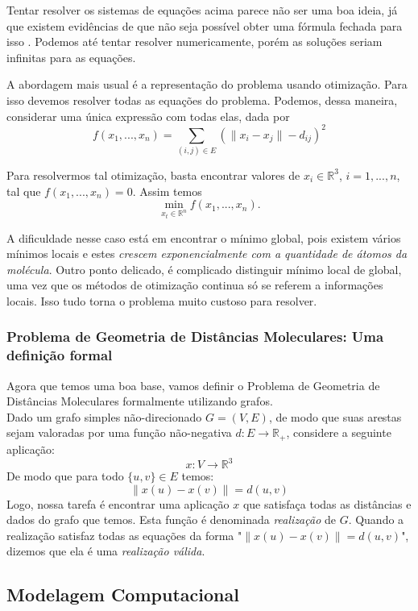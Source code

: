 \documentclass[a4paper,12pt]{article}
\begin{document}
\begin{itemize}
		Tentar resolver os sistemas de equações acima parece não ser uma boa ideia, já que existem evidências de que não seja possível obter uma fórmula fechada para isso \cite{carlileBook31Coloquio}. Podemos até tentar resolver numericamente, porém as soluções seriam infinitas para as equações.
		
		A abordagem mais usual é a representação do problema usando otimização. Para isso devemos  resolver todas as equações do problema. Podemos, dessa maneira, considerar uma única expressão com todas elas, dada por
		$$ f(x_1, ...,x_n) \equal \sum_{(i,j) \in E} (\|x_i - x_j\| - d_{ij})^2
		$$
		
		Para resolvermos tal otimização, basta encontrar valores de $x_i \in \mathbb{R}^3$, $i = 1, ..., n$, tal que $f(x_1, ...,x_n)=0.$ Assim temos
		$$ \min_{x_t \in\mathbb{R}^n} f(x_1, ...,x_n).
		$$
		
		A dificuldade nesse caso está em encontrar o mínimo global, pois existem vários mínimos locais e estes\textit{ crescem exponencialmente com a  quantidade de átomos da molécula}. Outro ponto delicado, é complicado distinguir mínimo local de global, uma vez que os métodos de otimização continua só se referem a informações locais. Isso tudo torna o problema muito custoso para resolver.
	\end{itemize}
	
	\subsubsection*{Problema de Geometria de Distâncias Moleculares: Uma definição formal}
	Agora que temos uma boa base, vamos definir o Problema de Geometria de Distâncias Moleculares formalmente utilizando grafos.
	\\
	
	Dado um grafo simples não-direcionado $G=(V,E)$, de modo que suas arestas sejam valoradas por uma função não-negativa $d:E\rightarrow\mathbb{R_+}$, considere a seguinte aplicação:
	$$x:V\rightarrow\mathbb{R}^3
	$$
	De modo que para todo $\{u,v\}\in E$ temos:
	$$\|x(u)-x(v)\|=d({u,v})
	$$
	Logo, nossa tarefa é encontrar uma aplicação $x$ que satisfaça todas as distâncias e dados do grafo que temos. Esta função é denominada \textit{realização} de $G$. Quando a realização satisfaz todas as equações da forma "$\|x(u)-x(v)\|=d({u,v})$", dizemos que ela é uma \textit{realização válida}.
	
	
	\subsection{Modelagem Computacional}
	
\end{document}
